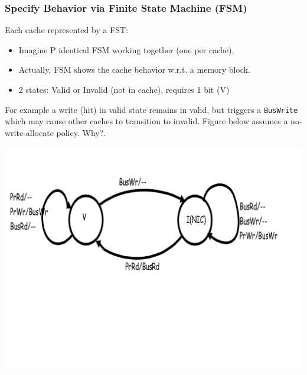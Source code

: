 \documentclass{beamer}
\newcommand{\emp}[1]{\textcolor{DikuRed}{ #1}}
\begin{document}
\begin{frame}[fragile,t]
\frametitle{Specify Behavior via Finite State Machine (FSM)}


Each cache represented by a FST:
\begin{itemize}
    \item Imagine P identical FSM working together (one per cache), 
    \item Actually, FSM shows the cache behavior w.r.t. a memory block.
    \item 2 states: Valid or Invalid (not in cache), requires 1 bit (V)
\end  {itemize}
\bigskip

For example a write (hit) in valid state remains in valid, but
triggers a {\tt BusWrite} which may cause other caches to transition
to invalid. 
\emp{Figure below assumes a no-write-allocate policy.} \alert{Why?}.

\includegraphics[width=59ex]{Figures/FigsInfCoherence/SimpleCohProt}

\end{frame}
\end{document}
